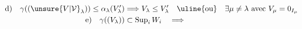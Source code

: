 \[
\begin{aligned}
\text{d)}\quad\gamma((\unsure{V|\mathcal V}_\lambda))\leq\alpha_\lambda(V'_\lambda)
&\Longrightarrow V_\lambda\leq V'_\lambda\quad\text{\uline{ou}}\quad\exists\mu\ne\lambda\ \text{avec } V_\mu=0_{I_\mu}\\
\text{e)}\quad\gamma((V_\lambda))&\subset\operatorname{Sup}_i W_i\quad\Longrightarrow
\end{aligned}
\]
